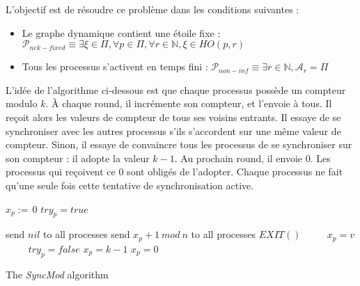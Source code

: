 \documentclass{article}
\begin{document}
L'objectif est de résoudre ce problème dans les conditions suivantes :
\begin{itemize}

	\item Le graphe dynamique contient une étoile fixe : $\mathcal{P}_{nek-fixed} \equiv \exists \xi \in \Pi, \forall p \in \Pi, \forall r \in \mathds{N}, \xi \in HO(p, r)$
	\item Tous les processus s'activent en temps fini : $\mathcal{P}_{non-inf} \equiv \exists r \in \mathds{N}, \mathcal{A}_r = \Pi$

\end{itemize}

L'idée de l'algorithme ci-dessous est que chaque processus possède un compteur modulo $k$. À chaque round, il incrémente son compteur, et l'envoie à tous.
Il reçoit alors les valeurs de compteur de tous ses voisins entrants. Il essaye de se synchroniser avec les autres processus s'ils s'accordent sur une même valeur de compteur.
Sinon, il essaye de convaincre tous les processus de se synchroniser sur son compteur : il adopte la valeur $k-1$. Au prochain round, il envoie $0$.
Les processus qui reçoivent ce $0$ sont obligés de l'adopter. Chaque processus ne fait qu'une seule fois cette tentative de synchronisation active.

\begin{algorithm}[htb]
\begin{distribalgo}[1]
\BLANK {}
  \STATE $x_p :=\, 0$ 
  \STATE $try_p = true$

\ENDINDENT \BLANK

    \STATE send $nil$ to all processes
  \ENDINDENT
\ENDINDENT
  \BLANK
{}
    \STATE send $x_p+1~mod~n$ to all processes
  \ENDINDENT
\ENDINDENT
  \BLANK
{}
	\STATE $EXIT()$ ~~~~
	\STATE $x_p = v$ ~~~~
	\STATE $try_p = false$
	\STATE $x_p = k - 1$
	\ELSE
	\STATE $x_p = 0$ ~~~~
	\ENDIF
  \ENDINDENT
\ENDINDENT 
\caption{The {\em SyncMod} algorithm} \label{algo:R}
\end{distribalgo}

\end{algorithm}
\end{document}
